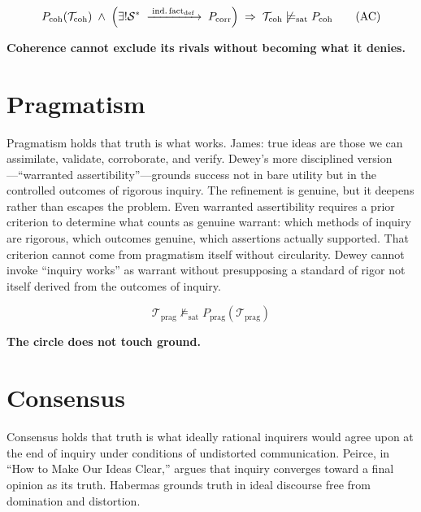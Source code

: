 \documentclass[11pt, oneside]{article}
\newcommand{\verdict}[1]{%
    \vspace{10pt}%
    \begin{center}\textcolor{LogosGold}{\textbf{#1}}\end{center}%
    \vspace{10pt}%
}
\begin{document}
\[
P_{\mathrm{coh}}(\mathcal{T}_{\mathrm{coh}}) \;\wedge\;
\Bigl(\exists!\mathcal{S}^{*}
  \;\xrightarrow{\;\text{ind.\,fact}_{\mathrm{def}}\;}\;
  P_{\mathrm{corr}}\Bigr)
\;\Rightarrow\;
\mathcal{T}_{\mathrm{coh}} \not\models_{\mathrm{sat}} P_{\mathrm{coh}}
\tag{AC}
\]

\verdict{Coherence cannot exclude its rivals without becoming what it denies.}

\section{Pragmatism}

Pragmatism holds that truth is what works. James: true ideas are those
we can assimilate, validate, corroborate, and verify. Dewey's more
disciplined version---``warranted assertibility''---grounds success not
in bare utility but in the controlled outcomes of rigorous inquiry. The
refinement is genuine, but it deepens rather than escapes the problem.
Even warranted assertibility requires a prior criterion to determine
what counts as genuine warrant: which methods of inquiry are rigorous,
which outcomes genuine, which assertions actually supported. That
criterion cannot come from pragmatism itself without circularity. Dewey cannot invoke ``inquiry works'' as warrant without presupposing
a standard of rigor not itself derived from the outcomes of inquiry.

\[
\mathcal{T}_{\mathrm{prag}} \not\models_{\mathrm{sat}}
P_{\mathrm{prag}}(\mathcal{T}_{\mathrm{prag}}) \tag{AC}
\]

\verdict{The circle does not touch ground.}

\section{Consensus}

Consensus holds that truth is what ideally rational inquirers would
agree upon at the end of inquiry under conditions of undistorted
communication. Peirce, in ``How to Make Our Ideas Clear,'' argues that
inquiry converges toward a final opinion as its truth. Habermas grounds
truth in ideal discourse free from domination and distortion.
\end{document}
